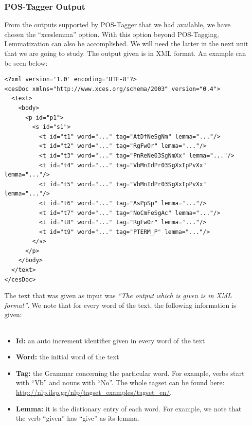 \subsubsection{POS-Tagger Output}\label{3222_ref}
From the outputs supported by POS-Tagger that we had available, we have chosen the ``xceslemma'' option. With this option beyond POS-Tagging, Lemmatization can also be accomplished. We will need the latter in the next unit that we are going to study. The output given is in XML format. An example can be seen below:\\
{}
\begin{lstlisting}[frame=single, basicstyle=\small]
<?xml version='1.0' encoding='UTF-8'?>
<cesDoc xmlns="http://www.xces.org/schema/2003" version="0.4">
  <text>
    <body>
      <p id="p1">
        <s id="s1">
          <t id="t1" word="..." tag="AtDfNeSgNm" lemma="..."/>
          <t id="t2" word="..." tag="RgFwOr" lemma="..."/>
          <t id="t3" word="..." tag="PnReNe03SgNmXx" lemma="..."/>
          <t id="t4" word="..." tag="VbMnIdPr03SgXxIpPvXx" lemma="..."/>
          <t id="t5" word="..." tag="VbMnIdPr03SgXxIpPvXx" lemma="..."/>
          <t id="t6" word="..." tag="AsPpSp" lemma="..."/>
          <t id="t7" word="..." tag="NoCmFeSgAc" lemma="..."/>
          <t id="t8" word="..." tag="RgFwOr" lemma="..."/>
          <t id="t9" word="..." tag="PTERM_P" lemma="..."/>
        </s>
      </p>
    </body>
  </text>
</cesDoc>
\end{lstlisting}
The text that was given as input was \textit{``The output which is given is in XML format''}. We note that for every word of the text, the following information is given:\\
\\
\begin{itemize}
	
	\item \textbf{Id:} an auto increment identifier given in every word of the text
	\item \textbf{Word:} the initial word of the text
	\item \textbf{Tag:} the Grammar concerning the particular word. For example, verbs start with ``Vb'' and nouns with ``No''. The whole tagset can be found here:\\ \url{http://nlp.ilsp.gr/nlp/tagset_examples/tagset_en/}.
	\item \textbf{Lemma:} it is the dictionary entry of each word. For example, we note that the verb ``given'' has ``give'' as its lemma.

\end{itemize}

